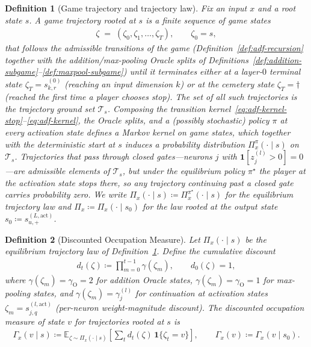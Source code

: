 \documentclass[twoside]{article}
\providecommand{\E}{}
\renewcommand{\E}{\mathbb{E}}
\newcommand{\1}{\mathbf{1}}
\newtheorem{definition}{Definition}
\begin{document}
\begin{definition}[Game trajectory and trajectory law]\label{def:trajectory-distribution}
Fix an input $x$ and a root state $s$. A \emph{game trajectory} rooted at $s$ is a finite sequence
of game states
\begin{align}
    \zeta \;=\; (\zeta_0, \zeta_1, \dots, \zeta_T), \qquad \zeta_0 = s,
\end{align}
that follows the admissible transitions of the game (Definition~\ref{def:adf-recursion} together
with the addition/max-pooling Oracle splits of
Definitions~\ref{def:addition-subgame}--\ref{def:maxpool-subgame}) until it terminates either at a
layer-$0$ terminal state $\zeta_T = s_{k,r}^{(0)}$ (reaching an input dimension $k$) or at the
cemetery state $\zeta_T = \dagger$ (reached the first time a player chooses \emph{stop}). The set
of all such trajectories is the trajectory \emph{ground set} $\mathcal{T}_s$. Composing the
transition kernel~\eqref{eq:adf-kernel-stop}--\eqref{eq:adf-kernel}, the Oracle splits, and a
(possibly stochastic) policy $\pi$ at every activation state defines a Markov kernel on game
states, which together with the deterministic start at $s$ induces a probability distribution
$\Pi_x^\pi(\cdot \mid s)$ on $\mathcal{T}_s$. Trajectories that pass through closed gates---neurons
$j$ with $\1[z_j^{(l)} > 0] = 0$---are admissible elements of $\mathcal{T}_s$, but under the
equilibrium policy $\pi^\star$ the player at the activation state stops there, so any trajectory
continuing past a closed gate carries probability zero. We write $\Pi_x(\cdot \mid s) \coloneqq
    \Pi_x^{\pi^\star}(\cdot \mid s)$ for the equilibrium \emph{trajectory law} and $\Pi_x \coloneqq
    \Pi_x(\cdot \mid s_0)$ for the law rooted at the output state $s_0 \coloneqq
    s_{u,+}^{(L,\mathrm{act})}$.
\end{definition}

\begin{definition}[Discounted Occupation Measure]\label{def:occupation}
Let $\Pi_x(\cdot \mid s)$ be the equilibrium trajectory law of
Definition~\ref{def:trajectory-distribution}.
Define the cumulative discount
\begin{align}
    d_t(\zeta) \coloneqq \prod_{m=0}^{t-1} \gamma(\zeta_m), \qquad d_0(\zeta) = 1,
\end{align}
where $\gamma(\zeta_m) = \gamma_{\mathrm{O}} = 2$ for addition Oracle states, $\gamma(\zeta_m) =
    \gamma_{\mathrm{O}} = 1$ for max-pooling states, and $\gamma(\zeta_m) = \gamma_j^{(l)}$ for
continuation at activation states $\zeta_m = s_{j,q}^{(l,\mathrm{act})}$ (per-neuron
weight-magnitude discount). The \emph{discounted occupation measure} of state $v$ for trajectories
rooted at $s$ is
\begin{align}
    \Gamma_x(v \mid s) \coloneq \E_{\zeta \sim \Pi_x(\cdot \mid s)}\left[\sum_t d_t(\zeta)\,\1\{\zeta_t
    = v\}\right],
    \qquad
    \Gamma_x(v) \coloneqq \Gamma_x(v \mid s_0).
\end{align}
\end{definition}
\end{document}
